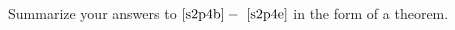 \documentclass[main.tex]{subfiles}
\begin{document}
\subproblem{}\label{s2p4f}

Summarize your answers to \(\ref{s2p4b} -~\ref{s2p4e}\) in the form of a
theorem.

\todo{}
\end{document}
